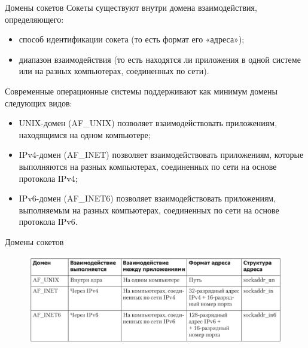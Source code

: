 \documentclass{beamer}
\begin{document}
\begin{frame}{Домены сокетов}
    Сокеты существуют внутри домена взаимодействия, определяющего:
    \begin{itemize}
        \item способ идентификации сокета (то есть формат его «адреса»);
        \item диапазон взаимодействия (то есть находятся ли приложения в одной системе или на разных компьютерах, соединенных по сети).
    \end{itemize}
    
    Современные операционные системы поддерживают как минимум домены следующих видов:
    \begin{itemize}
        \item UNIX-домен (AF\_UNIX) позволяет взаимодействовать приложениям, находящимся на одном компьютере;
        \item IPv4-домен (AF\_INET) позволяет взаимодействовать приложениям, которые выполняются на разных компьютерах, соединенных по сети на основе протокола IPv4;
        \item IPv6-домен (AF\_INET6) позволяет взаимодействовать приложениям, выполняемым на разных компьютерах, соединенных по сети на основе протокола IPv6.
    \end{itemize}
\end{frame}

\begin{frame}{Домены сокетов}
    \begin{figure}
    \includegraphics[scale=0.35]{images/domains.png}
    \end{figure}
\end{frame}
\end{document}
